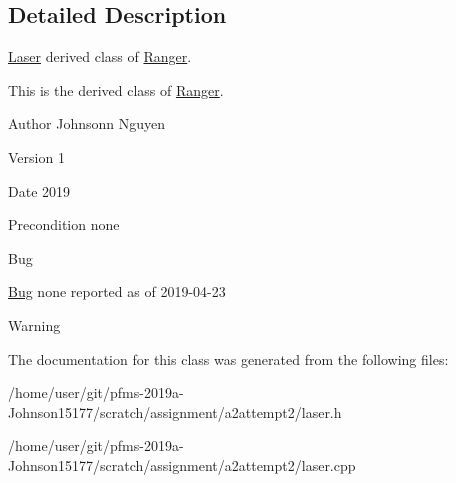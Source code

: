 \subsection{Detailed Description}
\hyperlink{classLaser}{Laser} derived class of \hyperlink{classRanger}{Ranger}. 

This is the derived class of \hyperlink{classRanger}{Ranger}.~\newline
\begin{DoxyAuthor}{Author}
Johnsonn Nguyen 
\end{DoxyAuthor}
\begin{DoxyVersion}{Version}
1 
\end{DoxyVersion}
\begin{DoxyDate}{Date}
2019 
\end{DoxyDate}
\begin{DoxyPrecond}{Precondition}
none 
\end{DoxyPrecond}
\begin{DoxyRefDesc}{Bug}
\item[\hyperlink{bug__bug000002}{Bug}]none reported as of 2019-\/04-\/23 \end{DoxyRefDesc}
\begin{DoxyWarning}{Warning}

\end{DoxyWarning}


The documentation for this class was generated from the following files\+:\begin{DoxyCompactItemize}
\item 
/home/user/git/pfms-\/2019a-\/\+Johnson15177/scratch/assignment/a2attempt2/laser.\+h\item 
/home/user/git/pfms-\/2019a-\/\+Johnson15177/scratch/assignment/a2attempt2/laser.\+cpp\end{DoxyCompactItemize}
